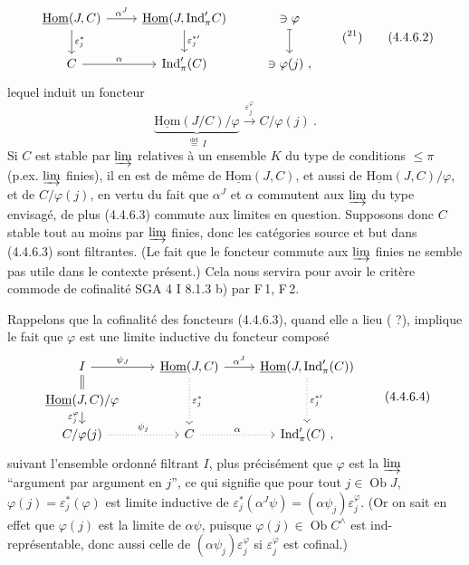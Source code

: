 \documentclass[11pt]{article}
\newcommand{\printedpage}[1]{\marginpar{\footnotesize p.~#1}}
\newcommand{\msp}[1]{\marginpar{\footnotesize [#1]}}
\newcommand{\uHom}{\underline{\mathrm{Hom}}}
\newcommand{\Ind}{\mathrm{Ind}}
\newcommand{\Ob}{\operatorname{Ob}}
\begin{document}
\printedpage{19}

\msp{page 84}
\[
\begin{tikzcd}
\uHom(J,C) \arrow[r, "\alpha^J"] \arrow[d, "\varepsilon_j^*"] & \uHom(J,\Ind'_\pi C) \arrow[d, "{\varepsilon_j^{*\prime}}"] & \ni \varphi \arrow[d, mapsto] \\
C \arrow[r, "\alpha"] & \Ind'_\pi(C) & \ni \varphi(j)\ ,
\end{tikzcd}
\qquad (\text{\footnotemark[21]})
\tag*{(4.4.6.2)}
\]
lequel induit un foncteur
\[
\underbrace{\uHom(J/C)/\varphi}_{\overset{\text{déf}}{=}\, I} \xrightarrow{\varepsilon_j^\varphi} C/\varphi(j)\ . \tag*{(4.4.6.3)} %
\]
Si $C$ est stable par $\varinjlim$ relatives à un ensemble $K$ du type de conditions $\leqslant \pi$ (p.ex. $\varinjlim$ finies), il en est de même de $\uHom(J,C)$, et aussi de $\uHom(J,C)/\varphi$, et de $C/\varphi(j)$, en vertu du fait que $\alpha^J$ et $\alpha$ commutent aux $\varinjlim$ du type envisagé, de plus (4.4.6.3) commute aux limites en question. Supposons donc $C$ stable tout au moins par $\varinjlim$ finies, donc les catégories source et but dans (4.4.6.3) sont filtrantes. (Le fait que le foncteur commute aux $\varinjlim$ finies ne semble pas utile dans le contexte présent.) Cela nous servira pour avoir le critère commode de cofinalité SGA 4 I 8.1.3 b) par F\,1, F\,2.

\msp{page 85}
Rappelons que la cofinalité des foncteurs (4.4.6.3), quand elle a lieu ( ?), implique le fait que $\varphi$ est une limite inductive du foncteur composé
\[
\begin{tikzcd}[row sep=small]
I \arrow[r, "\psi_J"] \arrow[d, equal] & \uHom(J,C) \arrow[r, "\alpha^J"] \arrow[dd, dotted, "\varepsilon_j^*"] & \uHom(J,\Ind'_\pi(C)) \arrow[dd, dotted, "{\varepsilon_j^{*\prime}}"] \\
\uHom(J,C)/\varphi \arrow[d, "\varepsilon_j^\varphi"'] & & \\
C/\varphi(j) \arrow[r, dotted, "\psi_j"] & C \arrow[r, dotted, "\alpha"] & \Ind'_\pi(C)\ ,
\end{tikzcd}
\tag*{(4.4.6.4)}
\]
suivant l'ensemble ordonné filtrant $I$, plus précisément que $\varphi$ est la $\varinjlim$ “argument par argument en $j$”, ce qui signifie que pour tout $j \in \Ob J$, $\varphi(j) = \varepsilon_j^*(\varphi)$ est limite inductive de $\varepsilon_j^*(\alpha^J\psi) = (\alpha\psi_j)\varepsilon_j^\varphi$. (Or on sait en effet que $\varphi(j)$ est la limite de $\alpha\psi$, puisque $\varphi(j) \in \Ob C^\wedge$ est ind-représentable, donc aussi celle de $(\alpha\psi_j)\varepsilon_j^\varphi$ si $\varepsilon_j^\varphi$ est cofinal.)
\end{document}
